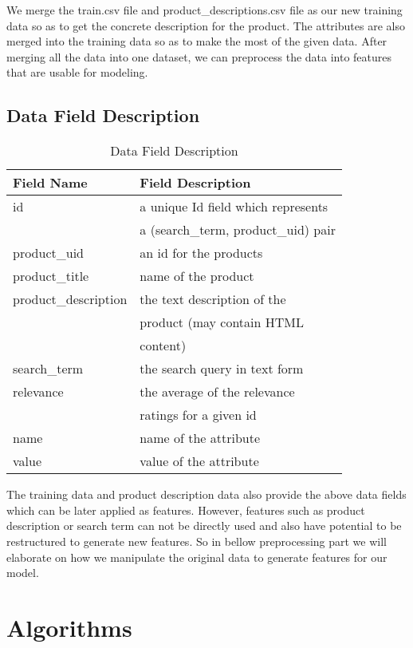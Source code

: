 \documentclass{sig-alternate-05-2015}
\begin{document}
We merge the train.csv file and product\_descriptions.csv file as our new training data so as to get the concrete description for the product. The attributes are also merged into the training data so as to make the most of the given data. After merging all the data into one dataset, we can preprocess the data into features that are usable for modeling. \\
\subsection{Data Field Description}
\begin{table}[ht]
\centering
\caption{Data Field Description}
\label{my-label}
\begin{tabular}{|l|l|}
\hline
\textbf{Field Name}  & \textbf{Field Description}  \\ \hline
id 				   & a unique Id field which represents \\
			            & a (search\_term, product\_uid) pair \\ \hline
product\_uid                 & an id for the products \\ \hline
product\_title       	   & name of the product   \\ \hline
product\_description 	   & the text description of the \\
				   & product (may contain HTML \\ 
				   & content)         \\ \hline
search\_term		   & the search query in text form \\\hline
relevance			   & the average of the relevance \\
				   & ratings for a given id\\ \hline
name		 	   & name of the attribute \\ \hline
value			   & value of the attribute \\ \hline
\end{tabular}
\end{table}
The training data and product description data also provide the above data fields which can be later applied as features. However, features such as product description or search term can not be directly used and also have potential to be restructured to generate new features. So in bellow preprocessing part we will elaborate on how we manipulate the original data to generate features for our model.

\section{Algorithms}
\end{document}
